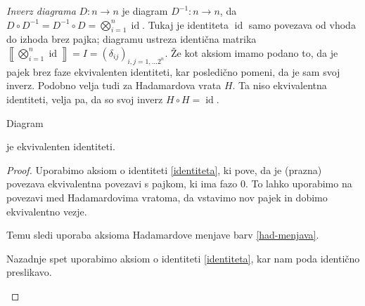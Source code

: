 \documentclass[mat1]{fmfdelo}
\newcommand{\interpret}[1]{\left\llbracket #1 \right\rrbracket}
\DeclareMathOperator*{\id}{id}
\begin{document}
\emph{Inverz diagrama} \(D:n\to n\) je diagram \(D^{-1}:n\to n\), da \(D\circ D^{-1} = D^{-1}\circ D = \bigotimes_{i=1}^n\id\). Tukaj je identiteta \(\id\) samo povezava od vhoda do izhoda brez pajka; diagramu ustreza identična matrika \(\interpret{\bigotimes_{i=1}^n\id} = I = (\delta_{ij})_{i,j=1,\ldots 2^n}\). Že kot aksiom imamo podano to, da je pajek brez faze ekvivalenten identiteti, kar posledično pomeni, da je sam svoj inverz. Podobno velja tudi za Hadamardova vrata \(H\). Ta niso ekvivalentna identiteti, velja pa, da so svoj inverz \(H\circ H = \id\).
\begin{izrek}\label{had-inverz}
    Diagram
\begin{center}
\end{center}
je ekvivalenten identiteti.
\end{izrek}
\begin{proof}

Uporabimo aksiom o identiteti \ref{identiteta}, ki pove, da je (prazna) povezava ekvivalentna povezavi s pajkom, ki ima fazo 0. To lahko uporabimo na povezavi med Hadamardovima vratoma, da vstavimo nov pajek in dobimo ekvivalentno vezje.
\begin{center}
\end{center}
Temu sledi uporaba aksioma Hadamardove menjave barv \ref{had-menjava}.
\begin{center}
\end{center}
Nazadnje spet uporabimo aksiom o identiteti \ref{identiteta}, kar nam poda identično preslikavo.
\begin{center}
\end{center}
\end{proof}
\end{document}
